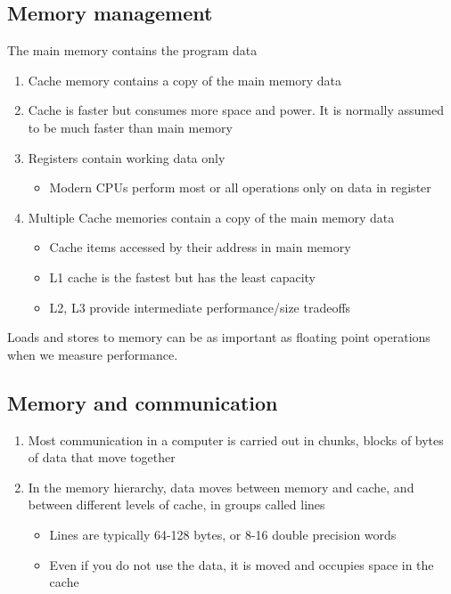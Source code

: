 \subsection*{Memory management}
The main memory contains the program data
\begin{enumerate}
\item Cache memory contains a copy of the main memory data

\item Cache is faster but consumes more space and power. It is normally assumed to be much faster than main memory

\item Registers contain working data only
\begin{itemize}

 \item Modern CPUs perform most or all operations only on data in register

\end{itemize}

\noindent
\item Multiple Cache memories contain a copy of the main memory data
\begin{itemize}

 \item Cache items accessed by their address in main memory

 \item L1 cache is the fastest but has the least capacity

 \item L2, L3 provide intermediate performance/size tradeoffs
\end{itemize}

\noindent
\end{enumerate}

\noindent
Loads and stores to memory can be as important as floating point operations when we measure performance.

\subsection*{Memory and communication}

\begin{enumerate}
\item Most communication in a computer is carried out in chunks, blocks of bytes of data that move together

\item In the memory hierarchy, data moves between memory and cache, and between different levels of cache, in groups called lines
\begin{itemize}

 \item Lines are typically 64-128 bytes, or 8-16 double precision words

 \item Even if you do not use the data, it is moved and occupies space in the cache
\end{itemize}

\noindent
\end{enumerate}


